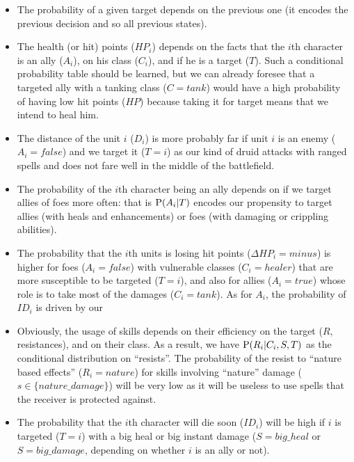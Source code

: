 \begin{itemize}
    \item The probability of a given target depends on the previous one (it encodes the previous decision and so all previous states). 
    \item The health (or hit) points ($HP_i$) depends on the facts that the $i$th character is an ally ($A_i$), on his class ($C_i$), and if he is a target ($T$). Such a conditional probability table should be learned, but we can already foresee that a targeted ally with a tanking class ($C=tank$) would have a high probability of having low hit points ($HP$) because taking it for target means that we intend to heal him.
    \item The distance of the unit $i$ ($D_i$) is more probably far if unit $i$ is an enemy ($A_i=false$) and we target it ($T=i$) as our kind of druid attacks with ranged spells and does not fare well in the middle of the battlefield.
    \item The probability of the $i$th character being an ally depends on if we target allies of foes more often: that is $\mathrm{P}(A_i|T)$ encodes our propensity to target allies (with heals and enhancements) or foes (with damaging or crippling abilities).
    \item The probability that the $i$th units is losing hit points ($\Delta HP_i=minus$) is higher for foes ($A_i=false$) with vulnerable classes ($C_i=healer$) that are more susceptible to be targeted ($T=i$), and also for allies ($A_i=true$) whose role is to take most of the damages ($C_i=tank$). As for $A_i$, the probability of $ID_i$ is driven by our %
    \item Obviously, the usage of skills depends on their efficiency on the target ($R$, resistances), and on their class. As a result, we have $\mathrm{P}(R_i|C_i,S,T)$ as the conditional distribution on ``resists''. The probability of the resist to ``nature based effects'' ($R_i=nature$) for skills involving ``nature'' damage ($s \in \{nature\_damage\}$) will be very low as it will be useless to use spells that the receiver is protected against.
    \item The probability that the $i$th character will die soon ($ID_i$) will be high if $i$ is targeted ($T=i$) with a big heal or big instant damage ($S=big\_heal$ or $S=big\_damage$, depending on whether $i$ is an ally or not). 

\end{itemize}
